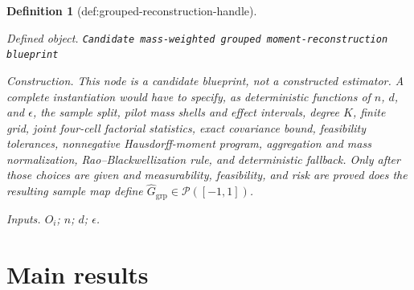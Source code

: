 \documentclass{article}
\newtheorem{definition}{Definition}
\begin{document}
\begin{definition}[def:grouped-reconstruction-handle]\label{def:grouped-reconstruction-handle}
\par\smallskip\noindent\emph{Defined object.} \texttt{Candidate mass-\allowbreak{}weighted grouped moment-\allowbreak{}reconstruction blueprint}
\par\smallskip\noindent\emph{Construction.} This node is a candidate blueprint, not a constructed estimator.  A complete instantiation would have to specify, as deterministic functions of \(n\), \(d\), and \(\epsilon\), the sample split, pilot mass shells and effect intervals, degree \(K\), finite grid, joint four-cell factorial statistics, exact covariance bound, feasibility tolerances, nonnegative Hausdorff-moment program, aggregation and mass normalization, Rao--Blackwellization rule, and deterministic fallback.  Only after those choices are given and measurability, feasibility, and risk are proved does the resulting sample map define \(\widehat G_{\mathrm{grp}}\in\mathcal P([-1,1])\).
\par\smallskip\noindent\emph{Inputs.} \(O_i\); \(n\); \(d\); \(\epsilon\).
\end{definition}

\section{Main results}
\end{document}
